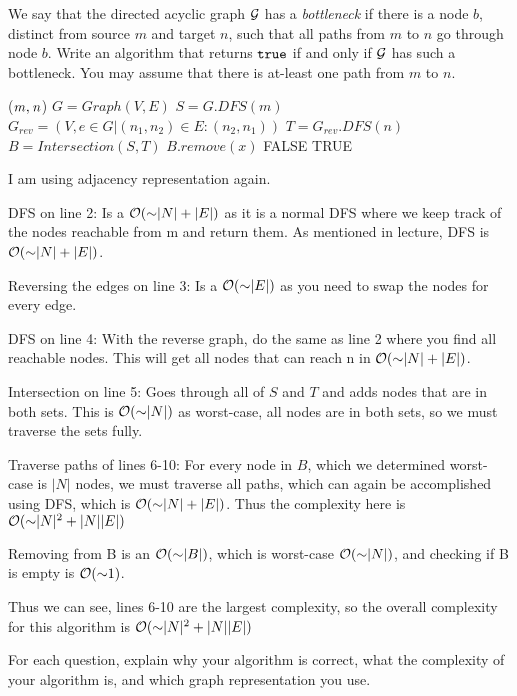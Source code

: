 \begin{problem}
\begin{questions}
\item We say that the directed acyclic graph $\mathcal{G}$ has a \emph{bottleneck} if there is a node $b$, distinct from source $m$ and target $n$, such that all paths from $m$ to $n$ go through node $b$. Write an algorithm that returns $\texttt{true}$ if  and only if $\mathcal{G}$ has such a bottleneck. You may assume that there is at-least one path from $m$ to $n$.

\begin{myalgo}{($\textit{m\/},\textit{n\/}$)}
  \STATE $G = Graph(V,E)$  
  \STATE $S = G.DFS(m)$ 
  \STATE $G_{rev} = (V, {e \in G | (n_1,n_2) \in E : (n_2,n_1)})$  
  \STATE $T = G_{rev}.DFS(n)$ 
  \STATE $B = Intersection(S,T)$ 
      \STATE $B.remove(x)$  
    \ENDIF
  \ENDFOR
    \RETURN FALSE
  \ENDIF
  \RETURN TRUE
\end{myalgo}

I am using adjacency representation again.

DFS on line 2: Is a $\mathcal{O}(\mathord{\sim}|N|+|E|)$ as it is a normal DFS where we keep track of the nodes reachable from m and return them. As mentioned in lecture, DFS is $\mathcal{O}(\mathord{\sim}|N|+|E|)$.

Reversing the edges on line 3: Is a $\mathcal{O}(\mathord{\sim}|E|)$ as you need to swap the nodes for every edge.

DFS on line 4: With the reverse graph, do the same as line 2 where you find all reachable nodes. This will get all nodes that can reach n in $\mathcal{O}(\mathord{\sim}|N|+|E|)$.

Intersection on line 5: Goes through all of $S$ and $T$ and adds nodes that are in both sets. This is $\mathcal{O}(\mathord{\sim}|N|)$ as worst-case, all nodes are in both sets, so we must traverse the sets fully.

Traverse paths of lines 6-10: For every node in $B$, which we determined worst-case is $|N|$ nodes, we must traverse all paths, which can again be accomplished using DFS, which is $\mathcal{O}(\mathord{\sim}|N|+|E|)$. Thus the complexity here is $\mathcal{O}(\mathord{\sim}|N|^2+|N||E|)$

Removing from B is an $\mathcal{O}(\mathord{\sim}|B|)$, which is worst-case $\mathcal{O}(\mathord{\sim}|N|)$, and checking if B is empty is $\mathcal{O}(\mathord{\sim}1)$.

Thus we can see, lines 6-10 are the largest complexity, so the overall complexity for this algorithm is $\mathcal{O}(\mathord{\sim}|N|^2+|N||E|)$

\end{questions}
For each question, explain why your algorithm is correct, what the complexity of your algorithm is, and which graph representation you use.
\end{problem}

